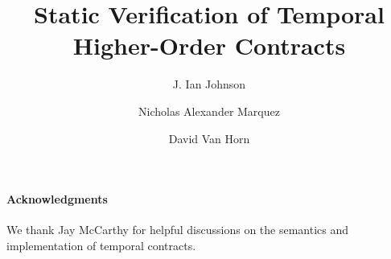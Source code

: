 \documentclass{llncs}
\begin{document}
\title{Static Verification of Temporal Higher-Order Contracts}

\author{J. Ian Johnson \and Nicholas Alexander Marquez \and David Van Horn}

\maketitle

\begin{abstract}

\end{abstract}



\paragraph{Acknowledgments}{We thank Jay McCarthy for helpful discussions on the semantics
and implementation of temporal contracts.}


\end{document}
